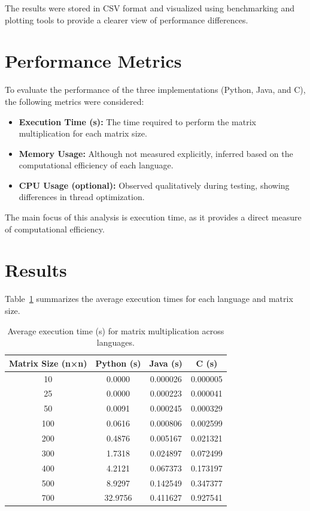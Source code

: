 \documentclass[a4paper,12pt]{article}
\begin{document}
The results were stored in CSV format and visualized using benchmarking and plotting tools to provide a clearer view of performance differences.

\section*{Performance Metrics}

To evaluate the performance of the three implementations (Python, Java, and C), the following metrics were considered:

\begin{itemize}
    \item \textbf{Execution Time (s):} The time required to perform the matrix multiplication for each matrix size.
    \item \textbf{Memory Usage:} Although not measured explicitly, inferred based on the computational efficiency of each language.
    \item \textbf{CPU Usage (optional):} Observed qualitatively during testing, showing differences in thread optimization.
\end{itemize}

The main focus of this analysis is execution time, as it provides a direct measure of computational efficiency.

\section*{Results}

Table~\ref{tab:results} summarizes the average execution times for each language and matrix size.

\begin{table}[H]
    \centering
    \caption{Average execution time (s) for matrix multiplication across languages.}
    \label{tab:results}
    \begin{tabular}{cccc}
        \toprule
        \textbf{Matrix Size (n×n)} & \textbf{Python (s)} & \textbf{Java (s)} & \textbf{C (s)} \\
        \midrule
        10  & 0.0000  & 0.000026  & 0.000005 \\
        25  & 0.0000  & 0.000223  & 0.000041 \\
        50  & 0.0091  & 0.000245  & 0.000329 \\
        100 & 0.0616  & 0.000806  & 0.002599 \\
        200 & 0.4876  & 0.005167  & 0.021321 \\
        300 & 1.7318  & 0.024897  & 0.072499 \\
        400 & 4.2121  & 0.067373  & 0.173197 \\
        500 & 8.9297  & 0.142549  & 0.347377 \\
        700 & 32.9756 & 0.411627  & 0.927541 \\
        \bottomrule
    \end{tabular}
\end{table}
\end{document}
